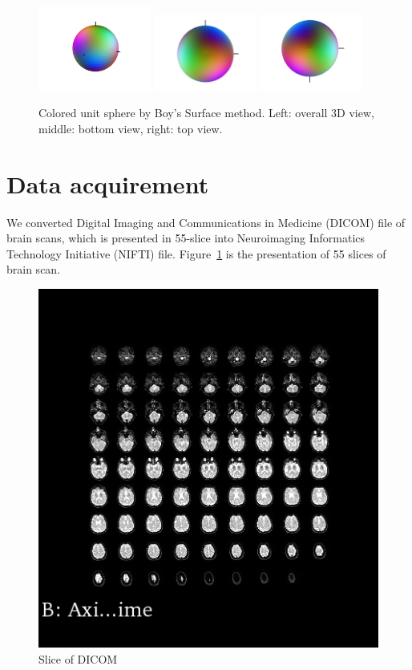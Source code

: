 \documentclass[hyperref, plainreport, noproblem]{cgvpub1}
\begin{document}
	\begin{figure}
		\centering
		\includegraphics[width=0.33\textwidth]{boys}
		\includegraphics[width=0.3\textwidth]{boys_zIn_yRight}
		\includegraphics[width=0.3\textwidth]{boys_zOut_yRight}
		\caption{Colored unit sphere by Boy's Surface method. Left: overall 3D view, middle: bottom view, right: top view.}
	\end{figure}

\section{Data acquirement}
We converted Digital Imaging and Communications in Medicine (DICOM) file of brain scans, which is presented in 55-slice into Neuroimaging Informatics Technology Initiative (NIFTI) file. Figure~\ref{fig:2} is the presentation of 55 slices of brain scan.

\begin{figure}[ht]
    \centering
    \includegraphics[width = 0.6\columnwidth]{2}
    \caption{ Slice of DICOM}
    \label{fig:2}
\end{figure}	
\end{document}
